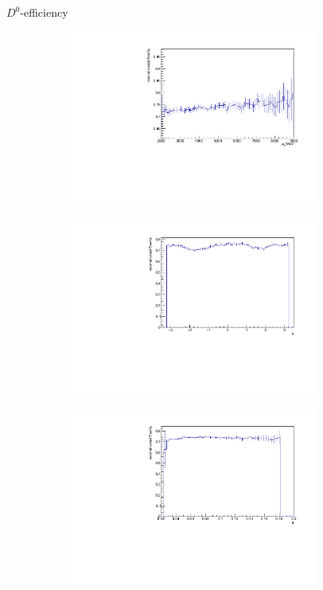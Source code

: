 \documentclass[11pt]{beamer}
\begin{document}
\begin{frame}{$D^0$-efficiency}
\begin{figure}
\begin{subfigure}{0.45\textwidth}
\includegraphics[width=0.9\textwidth]{up_pdf/neg/h_pt_reco_D0_neg.pdf}
\end{subfigure}
\begin{subfigure}{0.45\textwidth}
\includegraphics[width=0.9\textwidth]{up_pdf/neg/h_phi_reco_D0_neg.pdf}
\end{subfigure}
\begin{subfigure}{0.45\textwidth}
\includegraphics[width=0.9\textwidth]{up_pdf/neg/h_theta_reco_D0_neg.pdf}

\end{subfigure}
\end{figure}
\end{frame}
\end{document}
